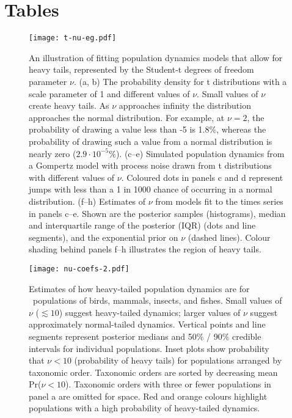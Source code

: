 


\clearpage

\section{Tables}



\begin{figure}[htbp]
\begin{center}
\texttt{[image: t-nu-eg.pdf]}
\caption{
An illustration of fitting population dynamics models that allow for heavy
tails, represented by the Student-t degrees of freedom parameter $\nu$. (a, b)
The probability density for t distributions with a scale parameter of 1 and
different values of $\nu$. Small values of $\nu$ create heavy tails. As $\nu$
approaches infinity the distribution approaches the normal distribution. For
example, at $\nu = 2$, the probability of drawing a value less than -5 is
1.8\%, whereas the probability of drawing such a value from a normal
distribution is nearly zero ($2.9\cdot10^{-5}$\%). (c--e) Simulated population
dynamics from a Gompertz model with process noise drawn from t distributions
with different values of $\nu$. Coloured dots in panels c and d represent jumps
with less than a 1 in 1000 chance of occurring in a normal distribution. (f--h)
Estimates of $\nu$ from models fit to the times series in panels c--e. Shown
are the posterior samples (histograms), median and interquartile range of the
posterior (IQR) (dots and line segments), and the exponential prior on $\nu$
(dashed lines). Colour shading behind panels f--h illustrates the region of
heavy tails.}
\label{fig:didactic}
\end{center}
\end{figure}

\clearpage

\begin{figure}[htbp]
\begin{center}
\texttt{[image: nu-coefs-2.pdf]}
\caption{
Estimates of how heavy-tailed population dynamics are for \nuCoefPopN\
populations of birds, mammals, insects, and fishes. Small values of $\nu$
($\lesssim 10$) suggest heavy-tailed dynamics; larger values of $\nu$ suggest
approximately normal-tailed dynamics. Vertical points and line segments
represent posterior medians and 50\% / 90\% credible intervals for individual
populations. Inset plots show probability that $\nu < 10$ (probability of heavy
tails) for populations arranged by taxonomic order. Taxonomic orders are sorted
by decreasing mean Pr($\nu < 10$). Taxonomic orders with three or fewer
populations in panel a are omitted for space. Red and orange colours highlight
populations with a high probability of heavy-tailed dynamics.
}
\label{fig:nu-coefs}
\end{center}
\end{figure}

